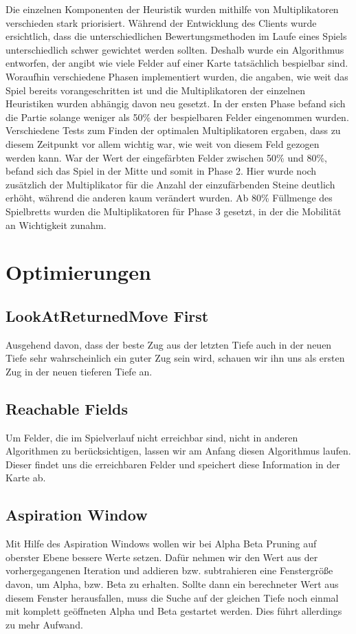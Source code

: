 \documentclass[12pt,a4paper,bibliography=totocnumbered,listof=totocnumbered]{article}
\begin{document}
Die einzelnen Komponenten der Heuristik wurden mithilfe von Multiplikatoren verschieden stark priorisiert. Während der Entwicklung des Clients wurde ersichtlich, dass die unterschiedlichen Bewertungsmethoden im Laufe eines Spiels unterschiedlich schwer gewichtet werden sollten. Deshalb wurde ein Algorithmus entworfen, der angibt wie viele Felder auf einer Karte tatsächlich bespielbar sind. Woraufhin verschiedene Phasen implementiert wurden, die angaben, wie weit das Spiel bereits vorangeschritten ist und die Multiplikatoren der einzelnen Heuristiken wurden abhängig davon neu gesetzt. In der ersten Phase befand sich die Partie solange weniger als 50\% der bespielbaren Felder eingenommen wurden. Verschiedene Tests zum Finden der optimalen Multiplikatoren ergaben, dass zu diesem Zeitpunkt vor allem wichtig war, wie weit von diesem Feld gezogen werden kann. War der Wert der eingefärbten Felder zwischen 50\% und 80\%, befand sich das Spiel in der Mitte und somit in Phase 2. Hier wurde noch zusätzlich der Multiplikator für die Anzahl der einzufärbenden Steine deutlich erhöht, während die anderen kaum verändert wurden. Ab 80\% Füllmenge des Spielbretts wurden die Multiplikatoren für Phase 3 gesetzt, in der die Mobilität an Wichtigkeit zunahm.
 
\newpage
\section{Optimierungen}
\subsection{LookAtReturnedMove First}
Ausgehend davon, dass der beste Zug aus der letzten Tiefe auch in der neuen Tiefe sehr wahrscheinlich ein guter Zug sein wird, schauen wir ihn uns als ersten Zug in der neuen tieferen Tiefe an.

\subsection{Reachable Fields}
Um Felder, die im Spielverlauf nicht erreichbar sind, nicht in anderen Algorithmen zu berücksichtigen, lassen wir am Anfang diesen Algorithmus laufen. Dieser findet uns die erreichbaren Felder und speichert diese Information in der Karte ab.

\subsection{Aspiration Window}
Mit Hilfe des Aspiration Windows wollen wir bei Alpha Beta Pruning auf oberster Ebene bessere Werte setzen. Dafür nehmen wir den Wert aus der vorhergegangenen Iteration und addieren bzw. subtrahieren eine Fenstergröße davon, um Alpha, bzw. Beta zu erhalten. Sollte dann ein berechneter Wert aus diesem Fenster herausfallen, muss die Suche auf der gleichen Tiefe noch einmal mit komplett geöffneten Alpha und Beta gestartet werden. Dies führt allerdings zu mehr Aufwand.
\end{document}
